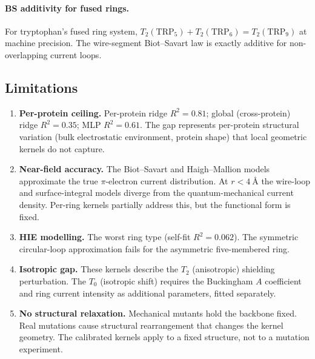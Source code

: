 \paragraph{BS additivity for fused rings.}
For tryptophan's fused ring system,
$T_2(\text{TRP}_5) + T_2(\text{TRP}_6) = T_2(\text{TRP}_9)$ at machine
precision.  The wire-segment Biot--Savart law is exactly additive for
non-overlapping current loops.


\subsection{Limitations}
\label{ssec:limitations}

\begin{enumerate}
  \item \textbf{Per-protein ceiling.}  Per-protein ridge $R^2 = 0.81$;
    global (cross-protein) ridge $R^2 = 0.35$; MLP $R^2 = 0.61$.  The
    gap represents per-protein structural variation (bulk electrostatic
    environment, protein shape) that local geometric kernels do not
    capture.

  \item \textbf{Near-field accuracy.}  The Biot--Savart and
    Haigh--Mallion models approximate the true $\pi$-electron current
    distribution.  At $r < \SI{4}{\angstrom}$ the wire-loop and
    surface-integral models diverge from the quantum-mechanical
    current density.  Per-ring kernels partially address this, but the
    functional form is fixed.

  \item \textbf{HIE modelling.}  The worst ring type (self-fit
    $R^2 = 0.062$).  The symmetric circular-loop approximation fails
    for the asymmetric five-membered ring.

  \item \textbf{Isotropic gap.}  These kernels describe the $T_2$
    (anisotropic) shielding perturbation.  The $T_0$ (isotropic shift)
    requires the Buckingham $A$ coefficient \cite{buckingham1960} and
    ring current intensity as additional parameters, fitted separately.

  \item \textbf{No structural relaxation.}  Mechanical mutants hold the
    backbone fixed.  Real mutations cause structural rearrangement that
    changes the kernel geometry.  The calibrated kernels apply to a
    fixed structure, not to a mutation experiment.
\end{enumerate}
